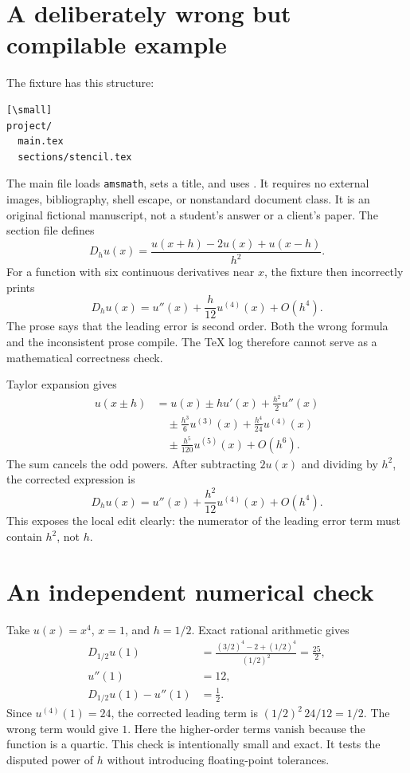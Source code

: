 \documentclass{ltugboat}
\begin{document}
\section{A deliberately wrong but compilable example}
The fixture has this structure:
\begin{verbatim}[\small]
project/
  main.tex
  sections/stencil.tex
\end{verbatim}
The main file loads \texttt{amsmath}, sets a title, and uses
\verb||. It requires no external images,
bibliography, shell escape, or nonstandard document class. It is an
original fictional manuscript, not a student's answer or a client's
paper. The section file defines
\begin{equation}\label{eq:dh}
 D_hu(x)=\frac{u(x+h)-2u(x)+u(x-h)}{h^2}.
\end{equation}
For a function with six continuous derivatives near $x$, the fixture
then incorrectly prints
\begin{equation}\label{eq:bad}
 D_hu(x)=u''(x)+\frac{h}{12}u^{(4)}(x)+O(h^4).
\end{equation}
The prose says that the leading error is second order. Both the wrong
formula and the inconsistent prose compile. The \TeX{} log therefore
cannot serve as a mathematical correctness check.

Taylor expansion gives
\begin{align*}
 u(x\mathbin{\pm}h)
 &=u(x)\mathbin{\pm}hu'(x)+\frac{h^2}{2}u''(x)\\
 &\quad\mathbin{\pm}\frac{h^3}{6}u^{(3)}(x)
 +\frac{h^4}{24}u^{(4)}(x)\\
 &\quad\mathbin{\pm}\frac{h^5}{120}u^{(5)}(x)+O(h^6).
\end{align*}
The sum cancels the odd powers. After subtracting $2u(x)$ and dividing
by $h^2$, the corrected expression is
\begin{equation}\label{eq:good}
 D_hu(x)=u''(x)+\frac{h^2}{12}u^{(4)}(x)+O(h^4).
\end{equation}
This exposes the local edit clearly: the numerator of the leading
error term must contain $h^2$, not $h$.

\section{An independent numerical check}
Take $u(x)=x^4$, $x=1$, and $h=1/2$. Exact rational arithmetic gives
\begin{align*}
 D_{1/2}u(1)
 &=\frac{(3/2)^4-2+(1/2)^4}{(1/2)^2}
 =\frac{25}{2},\\
 u''(1)&=12,\\
 D_{1/2}u(1)-u''(1)&=\frac12.
\end{align*}
Since $u^{(4)}(1)=24$, the corrected leading term is
$(1/2)^2\,24/12=1/2$. The wrong term would give $1$.
Here the higher-order terms vanish because the function is a quartic.
This check is intentionally small and exact. It tests the disputed
power of $h$ without introducing floating-point tolerances.
\end{document}
